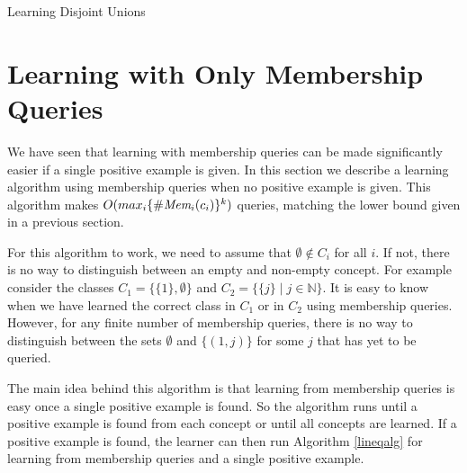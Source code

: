 \documentclass[11pt]{amsart}
\begin{document}
\begin{algorithm}[H]
\label{disjalg}
\SetAlgoLined
{}
\;
\caption{Learning Disjoint Unions}
\end{algorithm}





\section{Learning with Only Membership Queries}

We have seen that learning with membership queries can be made significantly easier if a single positive example is given. 
In this section we describe a learning algorithm using membership queries when no positive example is given. 
This algorithm makes $O(max_i \{ \#\emph{Mem}_{i}(c_i) \}^k)$ queries, matching the lower bound given in a previous section. 

For this algorithm to work, we need to assume that $\emptyset \not\in C_i$ for all $i$.
If not, there is no way to distinguish between an empty and non-empty concept. 
For example consider the classes $C_1 = \{ \{1\}, \emptyset \}$ and $C_2 = \{ \{j \} \mid j \in \mathbb{N} \}$. 
It is easy to know when we have learned the correct class in $C_1$ or in $C_2$ using membership queries. 
However, for any finite number of membership queries, there is no way to distinguish between the sets $\emptyset$ and $\{(1,j)\}$ for some $j$ that has yet to be queried.


The main idea behind this algorithm is that learning from membership queries is easy once a single positive example is found. 
So the algorithm runs until a positive example is found from each concept or until all concepts are learned. 
If a positive example is found, the learner can then run Algorithm \ref{lineqalg} for learning from membership queries and a single positive example. 
\end{document}
